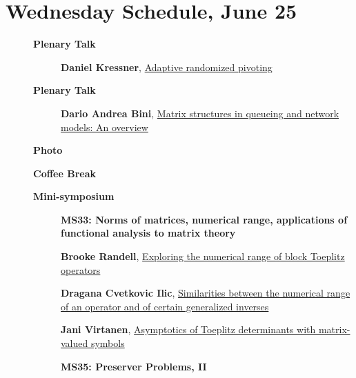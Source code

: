 \documentclass[ILAS2025-program.tex]{subfiles}
\begin{document}
\section{Wednesday Schedule, June 25}
    
    \begin{description}
    \item[] \textbf{Plenary Talk} 
    \begin{description}
        \item[] \hypertarget{up0004}{}\textbf{Daniel Kressner}, \hyperlink{down0004}{Adaptive randomized pivoting}
        \end{description}
        \item[] \textbf{Plenary Talk} 
    \begin{description}
        \item[] \hypertarget{up0005}{}\textbf{Dario Andrea Bini}, \hyperlink{down0005}{Matrix structures in queueing and network models: An overview}
        \end{description}
        \item[] \textbf{Photo} 
    \item[] \textbf{Coffee Break} 
    \item[] \textbf{Mini-symposium} 
    \begin{description}
    \item[] {\color{mstitle}\textbf{MS33: Norms of matrices, numerical range, applications of functional analysis to matrix theory}} 
    \item[] \hypertarget{up0244}{}\textbf{Brooke Randell}, \hyperlink{down0244}{Exploring the numerical range of block Toeplitz operators}
        \item[] \hypertarget{up0245}{}\textbf{Dragana Cvetkovic Ilic}, \hyperlink{down0245}{Similarities between the numerical range of an operator and of certain generalized inverses}
        \item[] \hypertarget{up0246}{}\textbf{Jani Virtanen}, \hyperlink{down0246}{Asymptotics of Toeplitz determinants with matrix-valued symbols
}
        \end{description}
    \begin{description}
    \item[] {\color{mstitle}\textbf{MS35: Preserver Problems, II}} 

\end{description}
\end{description}
\end{document}

